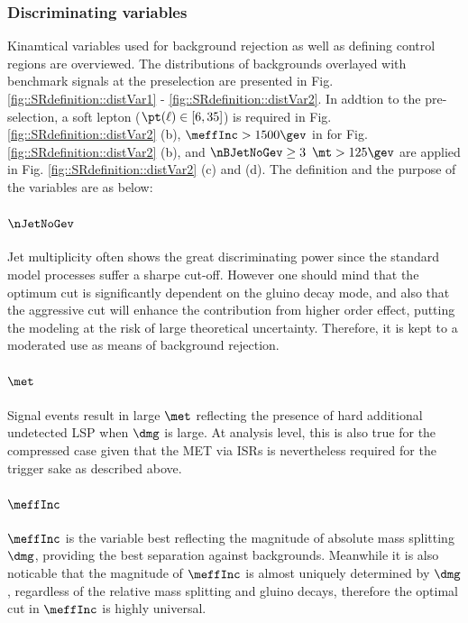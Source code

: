 \clearpage
\subsubsection{Discriminating variables}
Kinamtical variables used for background rejection as well as defining control regions are overviewed. The distributions of backgrounds overlayed with benchmark signals at the preselection are presented in Fig. \ref{fig::SRdefinition::distVar1} - \ref{fig::SRdefinition::distVar2}. In addtion to the pre-selection, a soft lepton ($\pt(\ell)\in[6,35]$) is required in Fig. \ref{fig::SRdefinition::distVar2} (b), $\meffInc>1500\gev$ in for Fig. \ref{fig::SRdefinition::distVar2} (b), and $\nBJetNoGev \geq3 \,\,\, \mt>125\gev$ are applied in Fig. \ref{fig::SRdefinition::distVar2} (c) and (d). The definition and the purpose of the variables are as below: \\

\paragraph{${\bf \nJetNoGev}$}
Jet multiplicity often shows the great discriminating power since the standard model processes suffer a sharpe cut-off.
However one should mind that the optimum cut is significantly dependent on the gluino decay mode, and also that the aggressive cut will enhance the contribution from higher order effect, putting the modeling at the risk of large theoretical uncertainty.
Therefore, it is kept to a moderated use as means of background rejection. \\

\paragraph{${\bf \met}$}
Signal events result in large $\met$ reflecting the presence of hard additional undetected LSP when $\dmg$ is large.
At analysis level, this is also true for the compressed case given that the MET via ISRs is nevertheless required for the trigger sake as described above.

\paragraph{${\bf \meffInc}$} 
$\meffInc$ is the variable best reflecting the magnitude of absolute mass splitting $\dmg$, providing the best separation against backgrounds.
Meanwhile it is also noticable that the magnitude of $\meffInc$ is almost uniquely determined by $\dmg$, regardless of the relative mass splitting and gluino decays, 
therefore the optimal cut in $\meffInc$ is highly universal.



